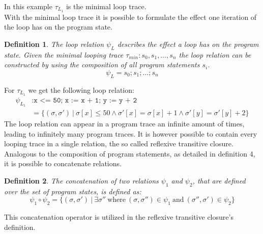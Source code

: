 \documentclass{article}
\newtheorem{mydef}{Definition}
\begin{document}
In this example $\tau_{L_1}$ is the minimal loop trace. \\

With the minimal loop trace it is possible to formulate the effect one iteration of the loop has on the program state.
\begin{mydef}
	The loop relation $\psi_L$ describes the effect a loop has on the program state.
	Given the minimal looping trace $\tau_{min}: s_0, s_1, \ldots, s_{n}$ the loop relation can be constructed by using the composition of all program statements $s_i$.
	\begin{equation*}
		\psi_L = s_0; s_1; \ldots; s_n
	\end{equation*}

\end{mydef}
For $\tau_{L_1}$ we get the following loop relation:
\begin{align*}
 	\psi_{L_1}&:	\texttt{x <= 50; x := x + 1; y := y + 2} \ \\
 	&= \{(\sigma, \sigma')\ |\ \sigma[x] \leq 50 \land \sigma'[x] = \sigma[x] + 1 \land \sigma'[y] = \sigma'[y] + 2 \}
\end{align*}
The loop relation can appear in a program trace an infinite amount of times, leading to infinitely many program traces. It is however possible to contain every looping trace in a single relation, the so called reflexive transitive closure. \\

Analogous to the composition of program statements, as detailed in definition 4, it is possible to concatenate relations.
\begin{mydef}
	The concatenation of two relations $\psi_1$ and $\psi_2$, that are defined over the set of program states, is defined as:
	\begin{equation*}
		\psi_1 \circ \psi_2 = \{(\sigma, \sigma')\ |\ \exists \sigma''\ \text{where}\ (\sigma, \sigma'') \in \psi_1\ \text{and}\ (\sigma'', \sigma') \in \psi_2 \}
	\end{equation*}
\end{mydef}

This concatenation operator is utilized in the reflexive transitive closure's definition.
\end{document}
